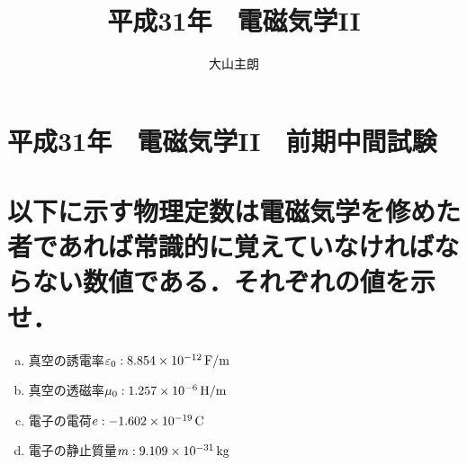 \documentclass[dvipdfmx]{ujarticle}
\begin{document}
\title{平成31年　電磁気学II}
\date{}
\author{大山主朗}

\maketitle

\section*{平成31年　電磁気学II　前期中間試験}

\section{以下に示す物理定数は電磁気学を修めた者であれば常識的に覚えていなければならない数値である．それぞれの値を示せ．}
\begin{enumerate}[(a)]
	\item 真空の誘電率$\varepsilon_{0}:8.854 \times 10^{-12}\,\rm{F/m}$
	\item 真空の透磁率$\mu_{0}:1.257 \times 10^{-6}\,\rm{H/m}$
	\item 電子の電荷$e:-1.602 \times 10^{-19}\,\rm{C}$
	\item 電子の静止質量$m:9.109\times 10^{-31}\,\rm{kg}$
\end{enumerate}
\end{document}
